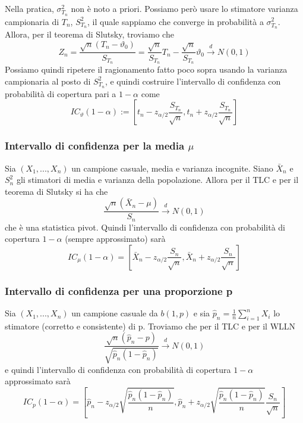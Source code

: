 Nella pratica, $\sigma^2_{T_n}$ non è noto a priori. Possiamo però usare lo stimatore varianza campionaria di $T_n$, $S^2_{T_n}$, il quale sappiamo che converge in probabilità a $\sigma^2_{T_n}$. Allora, per il teorema di Slutsky, troviamo che 
$$Z_n=\frac{\sqrt{n}(T_n - \vartheta_0)}{S_{T_n}} = \frac{\sqrt{n}}{S_{T_n}} T_n - \frac{\sqrt{n}}{S_{T_n}} \vartheta_0 \stackrel{d}{\rightarrow}N(0,1)$$ Possiamo quindi ripetere il ragionamento fatto poco sopra usando la varianza campionaria al posto di $S^2_{T_n}$, e quindi costruire l'intervallo di confidenza con probabilità di copertura pari a $1 - \alpha$ come $$IC_\vartheta (1-\alpha) := \left[t_n - z_{\alpha / 2} \frac{S_{T_n}}{\sqrt{n}}, t_n + z_{\alpha / 2} \frac{S_{T_n}}{\sqrt{n}}\right]$$
\subsubsection{Intervallo di confidenza per la media $\mu$}
Sia $(X_1,...,X_n)$ un campione casuale, media e varianza incognite. Siano $\bar{X}_n$ e $S^2_n$ gli stimatori di media e varianza della popolazione. Allora per il TLC e per il teorema di Slutsky si ha che 
$$\frac{\sqrt{n}(\bar{X}_n - \mu)}{S_n} \stackrel{d}{\rightarrow}N(0,1)$$
che è una statistica pivot. Quindi l'intervallo di confidenza con probabilità di copertura $1-\alpha$ (sempre approssimato) sarà
$$IC_\mu(1-\alpha)=\left[\bar{X}_n - z_{\alpha / 2} \frac{S_n}{\sqrt{n}}, \bar{X}_n + z_{\alpha / 2} \frac{S_n}{\sqrt{n}}\right]$$
\subsubsection{Intervallo di confidenza per una proporzione p}
Sia $(X_1,...,X_n)$ un campione casuale da $b(1,p)$ e sia $\hat{p}_n=\frac{1}{n} \sum_{i=1}^n X_i$ lo stimatore (corretto e consistente) di p. Troviamo che per il TLC e per il WLLN $$\frac{\sqrt{n}(\hat{p}_n - p)}{\sqrt{\hat{p}_n(1-\hat{p}_n)}} \stackrel{d}{\rightarrow}N(0,1)$$
e quindi l'intervallo di confidenza con probabilità di copertura $1-\alpha$ approssimato sarà
$$IC_p(1-\alpha)=
\left[\hat{p}_n -
 z_{\alpha / 2} 
 \sqrt{\frac{\hat{p}_n(1-\hat{p}_n)}{n}},
  \hat{p}_n + z_{\alpha / 2}\sqrt{\frac{\hat{p}_n(1-\hat{p}_n)}{n}} \frac{S_n}{\sqrt{n}}\right]$$